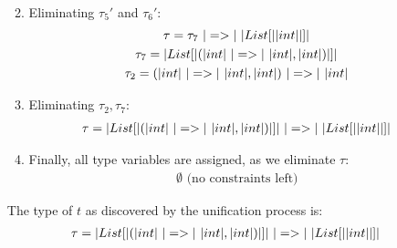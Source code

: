 \begin{exercise}{}
\begin{solution}
\begin{enumerate}
\begin{enumerate}
\begin{gather*}
        \end{gather*}
        \item Eliminating \(\tau_5'\) and \(\tau_6'\):
        \begin{gather*}
          \tau = \tau_7 ~\ato~ \alist{\aint}  \\
          \tau_7 = \alist{(\aint ~\ato~ \aint, \aint)} \\
          \tau_2 = (\aint ~\ato~ \aint, \aint) ~\ato~ \aint
        \end{gather*}
        \item Eliminating \(\tau_2, \tau_7\):
        \begin{gather*}
          \tau = \alist{(\aint ~\ato~ \aint, \aint)} ~\ato~ \alist{\aint}
        \end{gather*}
        \item Finally, all type variables are assigned, as we eliminate \(\tau\):
        \begin{gather*}
          \emptyset \text{ (no constraints left)}
        \end{gather*}
      \end{enumerate}

      The type of \(t\) as discovered by the unification process is:
      \begin{gather*}
        \tau = \alist{(\aint ~\ato~ \aint, \aint)} ~\ato~ \alist{\aint}
      \end{gather*}
    \end{enumerate}
  \end{solution}

\end{exercise}
